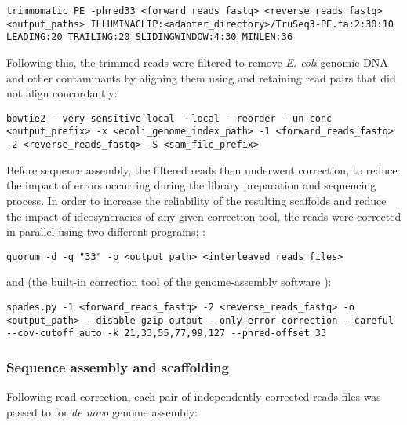 \begin{lstlisting}
trimmomatic PE -phred33 <forward_reads_fastq> <reverse_reads_fastq> <output_paths> ILLUMINACLIP:<adapter_directory>/TruSeq3-PE.fa:2:30:10 LEADING:20 TRAILING:20 SLIDINGWINDOW:4:30 MINLEN:36
\end{lstlisting}

\noindent Following this, the trimmed reads were filtered to remove \textit{E. coli} genomic DNA and other contaminants by aligning them using  \parencite{langmead2012bowtie2} and retaining read pairs that did not align concordantly:

\begin{lstlisting}
bowtie2 --very-sensitive-local --local --reorder --un-conc <output_prefix> -x <ecoli_genome_index_path> -1 <forward_reads_fastq> -2 <reverse_reads_fastq> -S <sam_file_prefix>
\end{lstlisting}

\noindent Before sequence assembly, the filtered reads then underwent correction, to reduce the impact of errors occurring during the library preparation and sequencing process. In order to increase the reliability of the resulting scaffolds and reduce the impact of ideosyncracies of any given correction tool, the reads were corrected in parallel using two different programs;  \parencite{marcais2015quorum}:

\begin{lstlisting}
quorum -d -q "33" -p <output_path> <interleaved_reads_files>
\end{lstlisting}

\noindent and  (the built-in correction tool of the  genome-assembly software \parencite{bankevich2012spades,nikolenko2013bayeshammer}):

\begin{lstlisting}
spades.py -1 <forward_reads_fastq> -2 <reverse_reads_fastq> -o <output_path> --disable-gzip-output --only-error-correction --careful --cov-cutoff auto -k 21,33,55,77,99,127 --phred-offset 33
\end{lstlisting}

\subsubsection{Sequence assembly and scaffolding}
\label{sec:methods_comp_bacs_assembly}

Following read correction, each pair of independently-corrected reads files was passed to  \parencite{bankevich2012spades} for \textit{de novo} genome assembly:

